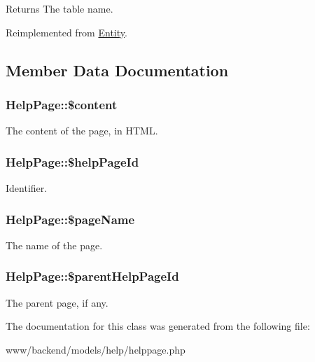 \begin{DoxyReturn}{Returns}
The table name. 
\end{DoxyReturn}


Reimplemented from \hyperlink{classEntity_a8305fd94740ac62cbafb9de76567ce37}{Entity}.



\subsection{Member Data Documentation}
\hypertarget{classHelpPage_acd7494d138a50cf9ab8d1e705afd85fe}{
\subsubsection[{\$content}]{\setlength{\rightskip}{0pt plus 5cm}HelpPage::\$content}}
\label{classHelpPage_acd7494d138a50cf9ab8d1e705afd85fe}
The content of the page, in HTML. \hypertarget{classHelpPage_a888d439b8b0c556098a7819d8fa2c94c}{
\subsubsection[{\$helpPageId}]{\setlength{\rightskip}{0pt plus 5cm}HelpPage::\$helpPageId}}
\label{classHelpPage_a888d439b8b0c556098a7819d8fa2c94c}
Identifier. \hypertarget{classHelpPage_ac4837216da4af2d7d266efd4767a147c}{
\subsubsection[{\$pageName}]{\setlength{\rightskip}{0pt plus 5cm}HelpPage::\$pageName}}
\label{classHelpPage_ac4837216da4af2d7d266efd4767a147c}
The name of the page. \hypertarget{classHelpPage_ad89f6f6fed9bd7514e226a9f79afabfc}{
\subsubsection[{\$parentHelpPageId}]{\setlength{\rightskip}{0pt plus 5cm}HelpPage::\$parentHelpPageId}}
\label{classHelpPage_ad89f6f6fed9bd7514e226a9f79afabfc}
The parent page, if any. 

The documentation for this class was generated from the following file:\begin{DoxyCompactItemize}
\item 
www/backend/models/help/helppage.php\end{DoxyCompactItemize}
